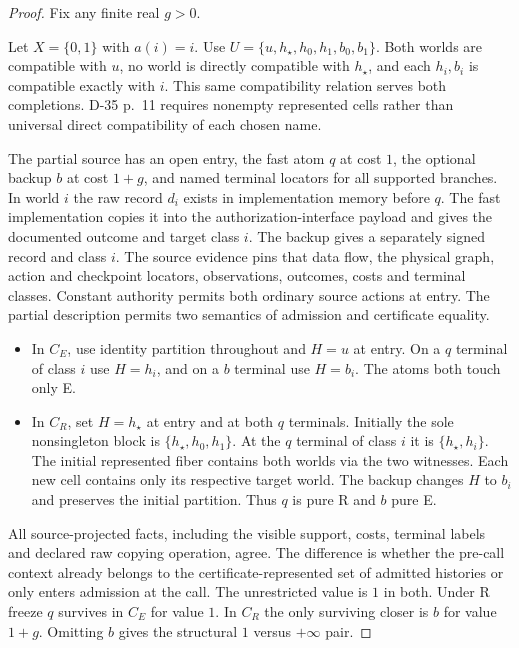 \begin{proof}

Fix any finite real \(g>0\).

Let \(X=\{0,1\}\) with \(a(i)=i\). Use \(U=\{u,h_\star,h_0,h_1,b_0,b_1\}\). Both worlds are compatible with \(u\), no world is directly compatible with \(h_\star\), and each \(h_i,b_i\) is compatible exactly with \(i\). This same compatibility relation serves both completions. D-35 p.~11 requires nonempty represented cells rather than universal direct compatibility of each chosen name.

The partial source has an open entry, the fast atom \(q\) at cost \(1\), the optional backup \(b\) at cost \(1+g\), and named terminal locators for all supported branches. In world \(i\) the raw record \(d_i\) exists in implementation memory before \(q\). The fast implementation copies it into the authorization-interface payload and gives the documented outcome and target class \(i\). The backup gives a separately signed record and class \(i\). The source evidence pins that data flow, the physical graph, action and checkpoint locators, observations, outcomes, costs and terminal classes. Constant authority permits both ordinary source actions at entry. The partial description permits two semantics of admission and certificate equality.

\begin{itemize}

\item
  In \(C_E\), use identity partition throughout and \(H=u\) at entry. On a \(q\) terminal of class \(i\) use \(H=h_i\), and on a \(b\) terminal use \(H=b_i\). The atoms both touch only E.
\item
  In \(C_R\), set \(H=h_\star\) at entry and at both \(q\) terminals. Initially the sole nonsingleton block is \(\{h_\star,h_0,h_1\}\). At the \(q\) terminal of class \(i\) it is \(\{h_\star,h_i\}\). The initial represented fiber contains both worlds via the two witnesses. Each new cell contains only its respective target world. The backup changes \(H\) to \(b_i\) and preserves the initial partition. Thus \(q\) is pure R and \(b\) pure E.
\end{itemize}

All source-projected facts, including the visible support, costs, terminal labels and declared raw copying operation, agree. The difference is whether the pre-call context already belongs to the certificate-represented set of admitted histories or only enters admission at the call. The unrestricted value is \(1\) in both. Under R freeze \(q\) survives in \(C_E\) for value \(1\). In \(C_R\) the only surviving closer is \(b\) for value \(1+g\). Omitting \(b\) gives the structural \(1\) versus \(+\infty\) pair.


\end{proof}
